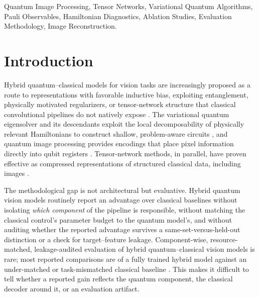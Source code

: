 \documentclass[journal]{IEEEtran}
\begin{document}
\begin{abstract}
protocol itself --- a resource-matched ablation and leakage-audited statistical validation suite --- together with a clean, reproducible negative result on natural-image reconstruction, a transferable leakage diagnostic, and a narrowly scoped, honestly bounded pair of positive results (entanglement-necessity and provable symmetry) that do not extrapolate into a natural-image or hardware quantum-advantage claim.
\end{abstract}

\begin{IEEEkeywords}
Quantum Image Processing, Tensor Networks, Variational Quantum Algorithms, Pauli Observables, Hamiltonian Diagnostics, Ablation Studies, Evaluation Methodology, Image Reconstruction.
\end{IEEEkeywords}

\section{Introduction}
Hybrid quantum--classical models for vision tasks are increasingly proposed as a route to representations with favorable inductive bias, exploiting entanglement, physically motivated regularizers, or tensor-network structure that classical convolutional pipelines do not natively expose \cite{Cerezo2021, Tilly2022, Preskill2018}. The variational quantum eigensolver and its descendants exploit the local decomposability of physically relevant Hamiltonians to construct shallow, problem-aware circuits \cite{Cerezo2021, Tilly2022, Bauer2020}, and quantum image processing provides encodings that place pixel information directly into qubit registers \cite{Chakraborty2018, Zhou2017, Yao2017}. Tensor-network methods, in parallel, have proven effective as compressed representations of structured classical data, including images \cite{Cirac2021, Latorre2005, Han2018, Stoudenmire2016, Fei2021, Guala2023, Araz2022}.

The methodological gap is not architectural but evaluative. Hybrid quantum vision models routinely report an advantage over classical baselines without isolating \emph{which component} of the pipeline is responsible, without matching the classical control's parameter budget to the quantum model's, and without auditing whether the reported advantage survives a same-set-versus-held-out distinction or a check for target--feature leakage. Component-wise, resource-matched, leakage-audited evaluation of hybrid quantum--classical vision models is rare; most reported comparisons are of a fully trained hybrid model against an under-matched or task-mismatched classical baseline \cite{Haga2024, Zhai2025, Nau2023, Liu2022}. This makes it difficult to tell whether a reported gain reflects the quantum component, the classical decoder around it, or an evaluation artifact.
\end{document}
